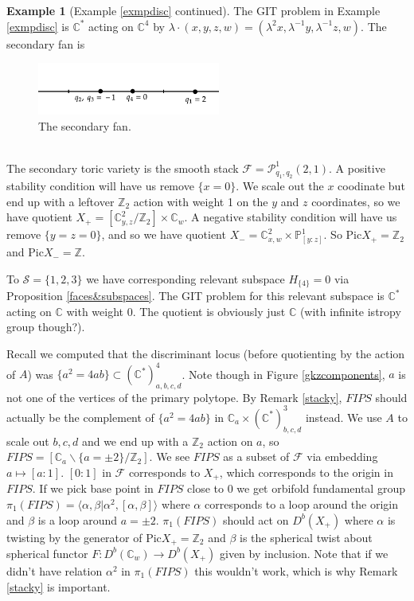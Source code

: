 \documentclass[oneside,reqno]{amsart}
\theoremstyle{definition}
\theoremstyle{definition}
\theoremstyle{definition}
\newtheorem{example}{Example} [section]
\theoremstyle{definition}
\newcommand{\CC}{\mathbb{C}}
\newcommand{\PP}{\mathbb{P}}
\newcommand{\Z}{\mathbb{Z}}
\newcommand{\Fs}{\mathcal{F}}
\begin{document}
\begin{example}[Example \ref{exmpdisc} continued]
    The GIT problem in Example \ref{exmpdisc} is $\CC^*$ acting on $\CC^4$ by $\lambda \cdot (x,y,z,w) = (\lambda^2x , \lambda^{-1}y, \lambda^{-1}z,w) $. The secondary fan is
    \begin{figure}[!h]
        \centering
        \includegraphics[width=6cm]{face&subspace/secondary.png}
        \caption{The secondary fan.}
    \end{figure}\\
    The secondary toric variety is the smooth stack $\Fs = \mathcal{P}^1_{q_1,q_2}(2,1)$. A positive stability condition will have us remove $\{ x=0\}$. We scale out the $x$ coodinate but end up with a leftover $\Z_2$ action with weight 1 on the $y$ and $z$ coordinates, so we have quotient $X_+ = [\CC^2_{y,z}/ \Z_2] \times \CC_w$. A negative stability condition will have us remove $\{ y=z=0\}$, and so we have quotient $X_- = \CC^2_{x,w} \times \PP^1_{[y:z]}$. So $\text{Pic} X_+ = \Z_2$ and $\text{Pic} X_- = \Z$.  \par
    To $\mathcal{S} = \{ 1,2,3\}$ we have corresponding relevant subspace $H_{\{4\}} =0$ via Proposition \ref{faces&subspaces}. The GIT problem for this relevant subspace is $\CC^*$ acting on $\CC$ with weight 0. The quotient is obviously just $\CC$ (with infinite istropy group though?). \par
    Recall we computed that the discriminant locus (before quotienting by the action of $A$) was $\{a^2 = 4ab \} \subset (\CC^*)^{4}_{a,b,c,d}$. Note though in Figure \ref{gkzcomponents}, $a$ is not one of the vertices of the primary polytope. By Remark \ref{stacky}, $FIPS$ should actually be the complement of $\{a^2 = 4ab \}$ in $\CC_a \times (\CC^*)^3_{b,c,d}$ instead. We use $A$ to scale out $b,c,d$ and  we end up with a $\Z_2$ action on $a$, so $FIPS = [\CC_a \backslash \{a = \pm 2 \} / \Z_2 ]$. We see $FIPS$ as a subset of $\Fs$ via embedding $a \mapsto [a:1]$. $[0:1]$ in $\Fs$ corresponds to $X_+$, which corresponds to the origin in $FIPS$. If we pick base point in $FIPS$ close to 0 we get orbifold fundamental group $ \pi_1(FIPS) = \langle \alpha, \beta | \alpha^2, [\alpha,\beta] \rangle$ where $\alpha$ corresponds to a loop around the origin and $\beta$ is a loop around $a = \pm 2$. $\pi_1(FIPS)$ should act on $D^b(X_+)$ where $\alpha$ is twisting by the generator of $\text{Pic} X_+ = \Z_2$ and $\beta$ is the spherical twist about spherical functor $F : D^b(\CC_w) \to D^b(X_+)$ given by inclusion. Note that if we didn't have relation $\alpha^2$ in $\pi_1(FIPS)$ this wouldn't work, which is why Remark \ref{stacky} is important.
\end{example}
\end{document}
